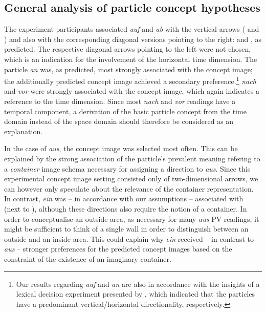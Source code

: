 \documentclass[output=paper]{langsci/langscibook}
\begin{document}
\subsection{General analysis of particle concept hypotheses}
\label{sec:disc-general}

The experiment participants associated \textit{auf} and \textit{ab}
with the vertical arrows ( and ) and
also with the corresponding diagonal versions pointing to the right:
 and , as predicted. The
respective diagonal arrows pointing to the left were not chosen, which
is an indication for the involvement of the horizontal time dimension.
%
The particle \textit{an} was, as predicted, most strongly associated
with the  concept image; the additionally predicted
 concept image achieved a secondary preference.\footnote{Our
  results regarding \textit{auf} and \textit{an} are also in
  accordance with the insights of a lexical decision experiment
  presented by \cite{FrassinelliEtAl:17ALTER}, which indicated that the
  particles have a predominant vertical/horizontal directionality,
  respectively.}
%
\textit{nach} and \textit{vor} were strongly associated with the
 concept image, which again indicates a reference to the time
dimension. Since most \textit{nach} and \textit{vor} readings have a
temporal component, a derivation of the basic particle concept from
the time domain instead of the space domain should therefore be
considered as an explanation.

In the case of \textit{aus}, the  concept image was selected
most often. This can be explained by the strong association of the
particle's prevalent meaning refering to a \textit{container} image
schema necessary for assigning a direction to \textit{aus}. Since this
experimental concept image setting consisted only of two-dimensional arrows, we
can however only speculate about the relevance of the container
representation. In contrast, \textit{ein} was -- in accordance with our
assumptions -- associated with  (next to
), although these directions also require the notion
of a container. In order to conceptualise an outside area, as
necessary for many \textit{aus} PV readings, it might be sufficient to
think of a single wall in order to distinguish between an outside and
an inside area. This could explain why \textit{ein} received -- in
contrast to \textit{aus} -- stronger preferences for the predicted concept images
based on the constraint of the existence of an imaginary container.
\end{document}
